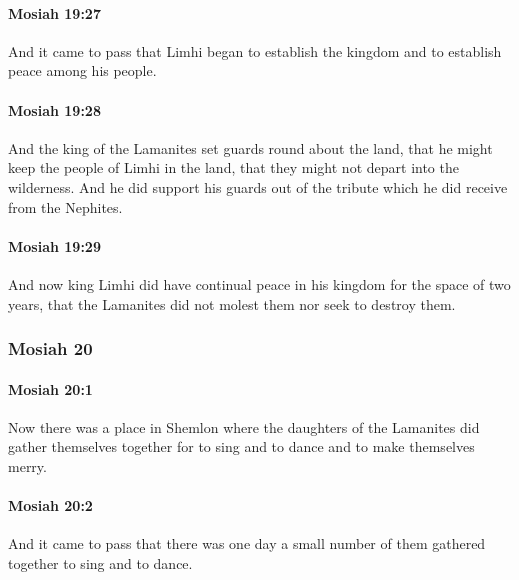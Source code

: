 		\paragraph{Mosiah 19:27} %
			\label{MOSIAH-19-27}

			And it came to pass that Limhi began to establish the kingdom
			and to establish peace among his people.

		\paragraph{Mosiah 19:28} %
			\label{MOSIAH-19-28}

			And the king of the Lamanites set guards round about the land,
			that he might keep the people of Limhi in the land,
			that they might not depart into the wilderness.
			And he did support his guards out of the tribute
			which he did receive from the Nephites.

		\paragraph{Mosiah 19:29} %
			\label{MOSIAH-19-29}

			And now king Limhi did have continual peace
			in his kingdom for the space of two years,
			that the Lamanites did not molest them nor seek to destroy them.

	\subsubsection{Mosiah 20} %
		\label{MOSIAH-20}
		
		\paragraph{Mosiah 20:1} %
			\label{MOSIAH-20-1}

			Now there was a place in Shemlon
			where the daughters of the Lamanites did gather themselves together
			for to sing and to dance and to make themselves merry.

		\paragraph{Mosiah 20:2} %
			\label{MOSIAH-20-2}

			And it came to pass that there was one day
			a small number of them gathered together to sing and to dance.

